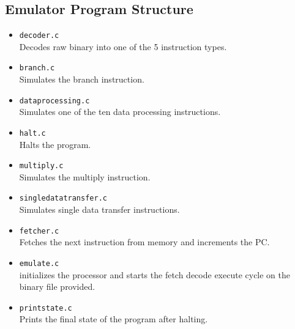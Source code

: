 \documentclass[8pt]{article}
\begin{document}
\begin{minipage}{0.45\textwidth}
\subsection{Emulator Program Structure}

\begin{itemize}
    \item \texttt{decoder.c} \\ Decodes raw binary into one of the 5 instruction 
    types.
    \item \texttt{branch.c} \\ Simulates the branch instruction.
    \item \texttt{dataprocessing.c} \\ Simulates one of the ten data processing 
    instructions.
    \item \texttt{halt.c} \\  Halts the program.
    \item \texttt{multiply.c} \\ Simulates the multiply instruction.
    \item \texttt{singledatatransfer.c} \\ Simulates single data transfer instructions.
    \item \texttt{fetcher.c} \\ Fetches the next instruction from memory and
    increments the PC.
    \item \texttt{emulate.c} \\ initializes the processor and starts the fetch decode
    execute cycle on the binary file provided. 
    \item \texttt{printstate.c} \\ Prints the final state of the program after 
    halting.
\end{itemize}
\end{minipage}%
\hfill
\end{document}
